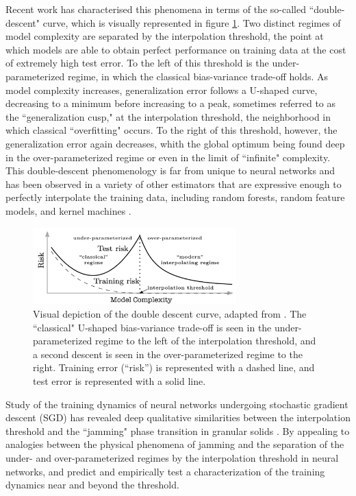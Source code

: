 \documentclass[a4paper, 12pt]{article}
\begin{document}
Recent work \cite{belkinReconcilingModernMachine2019} has characterised this phenomena in terms of the so-called ``double-descent" curve, which is visually represented in figure \ref{doubledescent}. Two distinct regimes of model complexity are separated by the interpolation threshold, the point at which models are able to obtain perfect performance on training data at the cost of extremely high test error. To the left of this threshold is the under-parameterized regime, in which the classical bias-variance trade-off holds. As model complexity increases, generalization error follows a U-shaped curve, decreasing to a minimum before increasing to a peak, sometimes referred to as the ``generalization cusp," at the interpolation threshold, the neighborhood in which classical ``overfitting" occurs. To the right of this threshold, however, the generalization error again decreases, whith the global optimum being found deep in the over-parameterized regime or even in the limit of ``infinite" complexity. This double-descent phenomenology is far from unique to neural networks and has been observed in a variety of other estimators that are expressive enough to perfectly interpolate the training data, including random forests, random feature models, and kernel machines \cite{ belkinReconcilingModernMachine2019, belkinUnderstandDeepLearning2018}.\\

\begin{figure}[ht]
\centering
\includegraphics[width=0.7\textwidth]{docs/assets/double_descent_reconciling.png}
\caption{Visual depiction of the double descent curve, adapted from \cite{belkinReconcilingModernMachine2019}. The ``classical" U-shaped bias-variance trade-off is seen in the under-parameterized regime to the left of the interpolation threshold, and a second descent is seen in the over-parameterized regime to the right. Training error (``risk'') is represented with a dashed line, and test error is represented with a solid line.}
\label{doubledescent}
\end{figure}


Study of the training dynamics of neural networks undergoing stochastic gradient descent (SGD)  has revealed deep qualitative similarities between the interpolation threshold and the ``jamming" phase transition in granular solids \cite{baity-jesiComparingDynamicsDeep2019, geigerJammingTransitionParadigm2019}. By appealing to analogies between the physical phenomena of jamming and the separation of the under- and over-parameterized regimes by the interpolation threshold in neural networks, \cite{geigerJammingTransitionParadigm2019} and \cite{spiglerJammingTransitionOverparametrization2019} predict and empirically test a characterization of the training dynamics near and beyond the threshold. 
\end{document}
